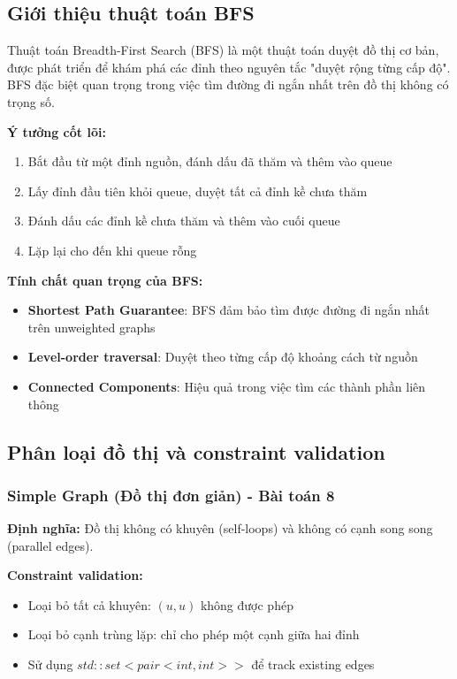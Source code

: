 \documentclass[12pt]{article}
\begin{document}
\subsection*{Giới thiệu thuật toán BFS}

Thuật toán Breadth-First Search (BFS) là một thuật toán duyệt đồ thị cơ bản, được phát triển để khám phá các đỉnh theo nguyên tắc "duyệt rộng từng cấp độ". BFS đặc biệt quan trọng trong việc tìm đường đi ngắn nhất trên đồ thị không có trọng số.

\textbf{Ý tưởng cốt lõi:}
\begin{enumerate}
    \item Bắt đầu từ một đỉnh nguồn, đánh dấu đã thăm và thêm vào queue
    \item Lấy đỉnh đầu tiên khỏi queue, duyệt tất cả đỉnh kề chưa thăm
    \item Đánh dấu các đỉnh kề chưa thăm và thêm vào cuối queue
    \item Lặp lại cho đến khi queue rỗng
\end{enumerate}

\textbf{Tính chất quan trọng của BFS:}
\begin{itemize}
    \item \textbf{Shortest Path Guarantee}: BFS đảm bảo tìm được đường đi ngắn nhất trên unweighted graphs
    \item \textbf{Level-order traversal}: Duyệt theo từng cấp độ khoảng cách từ nguồn
    \item \textbf{Connected Components}: Hiệu quả trong việc tìm các thành phần liên thông
\end{itemize}

\subsection*{Phân loại đồ thị và constraint validation}

\subsubsection*{Simple Graph (Đồ thị đơn giản) - Bài toán 8}
\textbf{Định nghĩa:} Đồ thị không có khuyên (self-loops) và không có cạnh song song (parallel edges).

\textbf{Constraint validation:}
\begin{itemize}
    \item Loại bỏ tất cả khuyên: $(u, u)$ không được phép
    \item Loại bỏ cạnh trùng lặp: chỉ cho phép một cạnh giữa hai đỉnh
    \item Sử dụng $std::set<pair<int, int>>$ để track existing edges
\end{itemize}
\end{document}
